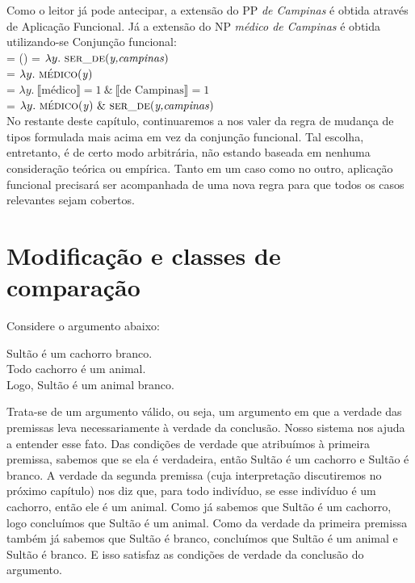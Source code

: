 \n Como o leitor já pode antecipar, a extensão do PP \textit{de Campinas} é obtida através de Aplicação
Funcional. Já a extensão do NP \textit{médico de Campinas} é obtida
utilizando-se Conjunção funcional:\\

\n {} = () = $\lambda y.\ \predica{ser\_de}{y,campinas}$\\
 = $\lambda y.\ \predica{médico}{y}$\\
 = $\lambda y.\ \llbracket \text{médico} \rrbracket = 1\ \&\ \llbracket \text{de Campinas} \rrbracket = 1$ \\
 = $\lambda y.\ \predica{médico}{y}\ \&\ \predica{ser\_de}{y,campinas}$ \\

No restante deste capítulo, continuaremos a nos valer da regra de mudança de tipos formulada
mais acima em vez da conjunção funcional. Tal escolha,
entretanto, é de certo modo arbitrária, não estando baseada em
nenhuma consideração teórica ou em\-pí\-ri\-ca. Tanto em um caso como no outro, aplicação funcional precisará ser acompanhada de uma nova regra para que todos os casos relevantes sejam cobertos.

\section{Modificação e classes de comparação}

Considere o argumento abaixo:

\begin{exe}
\ex Sultão é um cachorro branco.\\
Todo cachorro é um animal.\\
Logo, Sultão é um animal branco.
\end{exe}

\n Trata-se de um argumento válido, ou seja, um argumento em que a
verdade das premissas leva necessariamente à verdade da conclusão.
Nosso sistema nos ajuda a entender esse fato. Das condições de
verdade que atribuímos à primeira premissa, sabemos que se ela é
verdadeira, então Sultão é um cachorro e Sultão é branco. A
verdade da segunda premissa (cuja interpretação discutiremos no
próximo capítulo) nos diz que, para todo indivíduo, se esse
indivíduo é um cachorro, então ele é um animal. Como já sabemos
que Sultão é um cachorro, logo concluímos que Sultão é um animal.
Como da verdade da primeira premissa também já sabemos que Sultão
é branco, concluímos que Sultão é um animal e Sultão é branco. E
isso satisfaz as condições de verdade da conclusão
do argumento.

